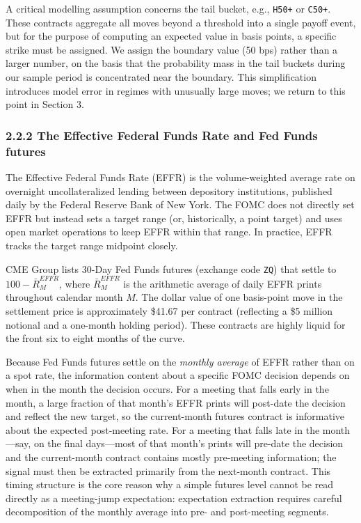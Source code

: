 A critical modelling assumption concerns the tail bucket, e.g., \texttt{H50+} or \texttt{C50+}. These contracts aggregate all moves beyond a threshold into a single payoff event, but for the purpose of computing an expected value in basis points, a specific strike must be assigned. We assign the boundary value (50 bps) rather than a larger number, on the basis that the probability mass in the tail buckets during our sample period is concentrated near the boundary. This simplification introduces model error in regimes with unusually large moves; we return to this point in Section 3.

\subsubsection*{2.2.2 The Effective Federal Funds Rate and Fed Funds futures}

The Effective Federal Funds Rate (EFFR) is the volume-weighted average rate on overnight uncollateralized lending between depository institutions, published daily by the Federal Reserve Bank of New York. The FOMC does not directly set EFFR but instead sets a target range (or, historically, a point target) and uses open market operations to keep EFFR within that range. In practice, EFFR tracks the target range midpoint closely.

CME Group lists 30-Day Fed Funds futures (exchange code \texttt{ZQ}) that settle to $100 - \bar{R}^{EFFR}_M$, where $\bar{R}^{EFFR}_M$ is the arithmetic average of daily EFFR prints throughout calendar month $M$. The dollar value of one basis-point move in the settlement price is approximately \$41.67 per contract (reflecting a \$5 million notional and a one-month holding period). These contracts are highly liquid for the front six to eight months of the curve.

Because Fed Funds futures settle on the \emph{monthly average} of EFFR rather than on a spot rate, the information content about a specific FOMC decision depends on when in the month the decision occurs. For a meeting that falls early in the month, a large fraction of that month's EFFR prints will post-date the decision and reflect the new target, so the current-month futures contract is informative about the expected post-meeting rate. For a meeting that falls late in the month---say, on the final days---most of that month's prints will pre-date the decision and the current-month contract contains mostly pre-meeting information; the signal must then be extracted primarily from the next-month contract. This timing structure is the core reason why a simple futures level cannot be read directly as a meeting-jump expectation: expectation extraction requires careful decomposition of the monthly average into pre- and post-meeting segments.

